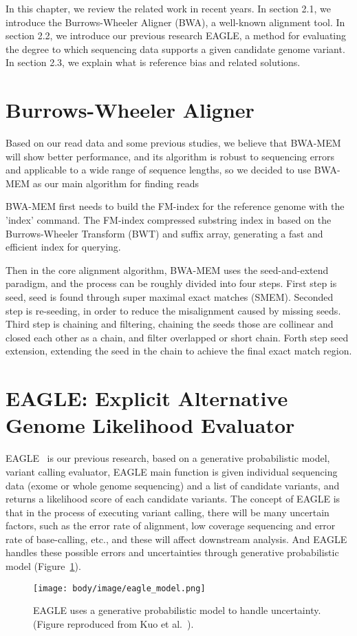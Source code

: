 \hspace{24pt}
In this chapter, we review the related work in recent years. In section 2.1, we introduce the Burrows-Wheeler Aligner (BWA), a well-known alignment tool. In section 2.2, we introduce our previous research EAGLE, a method for evaluating the degree to which sequencing data supports a given candidate genome variant. In section 2.3, we explain what is reference bias and related solutions.
\section{Burrows-Wheeler Aligner}
Based on our read data and some previous studies, we believe that BWA-MEM will show better performance\cite{hwang2015systematic}, and its algorithm is robust to sequencing errors and applicable to a wide range of sequence lengths, so we decided to use BWA-MEM as our main algorithm for finding reads

BWA-MEM first needs to build the FM-index \cite{ferragina2005indexing} for the reference genome with the 'index' command.  The FM-index compressed substring index in based on the Burrows-Wheeler Transform (BWT) \cite{burrows1994block} and suffix array, generating a fast and efficient index for querying.

Then in the core alignment algorithm, BWA-MEM uses the seed-and-extend paradigm, and the process can be roughly divided into four steps. First step is seed, seed is found through super maximal exact matches (SMEM). Seconded step is re-seeding, in order to reduce the misalignment caused by missing seeds. Third step is chaining and filtering, chaining the seeds those are collinear and closed each other as a chain, and filter overlapped or short chain. Forth step seed extension, extending the seed in the chain to achieve the final exact match region.
\section{EAGLE: Explicit Alternative Genome Likelihood Evaluator}
EAGLE~\cite{kuo2018eagle} is our previous research, based on a generative probabilistic model, variant calling evaluator, EAGLE main function is given individual sequencing data (exome or whole genome sequencing) and a list of candidate variants, and returns a likelihood score of each candidate variants.
The concept of EAGLE is that in the process of executing variant calling, there will be many uncertain factors, such as the error rate of alignment, low coverage sequencing and error rate of base-calling, etc., and these will affect downstream analysis. And EAGLE handles these possible errors and uncertainties through generative probabilistic model  (Figure~\ref{eagle_model}).
\begin{figure}[ht]
\center
\texttt{[image: body/image/eagle\_model.png]}
\caption[EAGLE model]{EAGLE uses a generative probabilistic model to handle uncertainty.
(Figure reproduced from Kuo et al.\ \cite{kuo2018eagle}).}
\label{eagle_model}
\end{figure}

